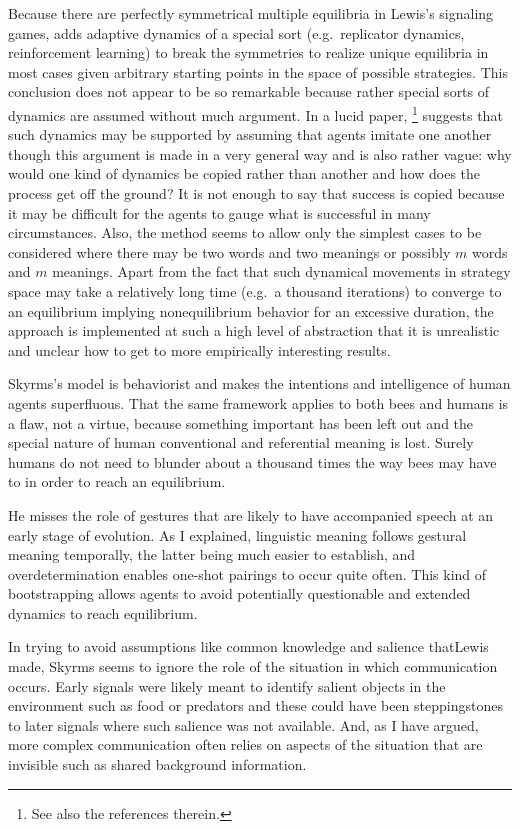 Because there are perfectly symmetrical multiple equilibria in Lewis's signaling games, \citet{skyrms:s} adds adaptive dynamics of a special sort (e.g.\ replicator dynamics, reinforcement learning) to break the symmetries to realize unique equilibria in most cases given arbitrary starting points in the space of possible strategies. This conclusion does not appear to be so remarkable because rather special sorts of dynamics are assumed without much argument. In a lucid paper, \citet{huttegger:eem}\footnote{See also the references therein.} suggests that such dynamics may be supported by assuming that agents imitate one another though this argument is made in a very general way and is also rather vague: why would one kind of dynamics be copied rather than another and how does the process get off the ground? It is not enough to say that success is copied because it may be difficult for the agents to gauge what is successful in many circumstances. Also, the method seems to allow only the simplest cases to be considered where there may be two words and two meanings or possibly $m$ words and $m$ meanings. Apart from the fact that such dynamical movements in strategy space may take a relatively long time (e.g.\ a thousand iterations) to converge to an equilibrium implying nonequilibrium behavior for an excessive duration, the approach is implemented at such a high level of abstraction that it is unrealistic and unclear how to get to more empirically interesting results.

Skyrms's model is behaviorist and makes the intentions and intelligence of human agents superfluous. That the same framework applies to both bees and humans is a flaw, not a virtue, because something important has been left out and the special nature of human conventional and referential meaning is lost. Surely humans do not need to blunder about a thousand times the way bees may have to in order to reach an equilibrium.

He misses the role of gestures that are likely to have accompanied speech at an early stage of evolution. As I explained, linguistic meaning follows gestural meaning temporally, the latter being much easier to establish, and overdetermination enables one-shot pairings to occur quite often. This kind of bootstrapping allows agents to avoid potentially questionable and extended dynamics to reach equilibrium.

In trying to avoid assumptions like common knowledge and salience that\linebreak Lewis made, Skyrms seems to ignore the role of the situation in which communication occurs. Early signals were likely meant to identify salient objects in the environment such as food or predators and these could have been steppingstones to later signals where such salience was not available. And, as I have argued, more complex communication often relies on aspects of the situation that are invisible such as shared background information.
 
